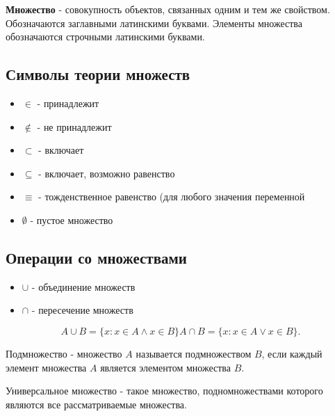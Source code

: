 \begin{definition}
  \textbf{Множество} - совокупность объектов, связанных одним и тем же свойством. Обозначаются заглавными латинскими буквами. Элементы множества обозначаются строчными латинскими буквами.
\end{definition}

\subsection{Символы теории множеств}

\begin{itemize}
  \item $\in$ - принадлежит\\
  \item $\notin$ - не принадлежит\\
  \item $\subset$ - включает\\
  \item $\subseteq$ - включает, возможно равенство\\
  \item $\equiv$ - тожденственное равенство (для любого значения переменной\\
  \item $\emptyset$ - пустое множество
\end{itemize}

\subsection{Операции со множествами}

\begin{itemize}
  \item $\cup$ - объединение множеств
  \item $\cap$ - пересечение множеств
\end{itemize}

\begin{note}
   \[
  A\cup B = \{ x : x\in A \land x\in B\} 
  A\cap B = \{x : x\in A \lor x\in B\} 
  .\] 
\end{note}

\begin{definition}
  Подмножество - множество $A$ называется подмножеством  $B$, если каждый элемент множества $A$ является элементом множества $B$.
\end{definition}

\begin{definition}
  Универсальное множество - такое множество, подномножествами которого являются все рассматриваемые множества.
\end{definition}

